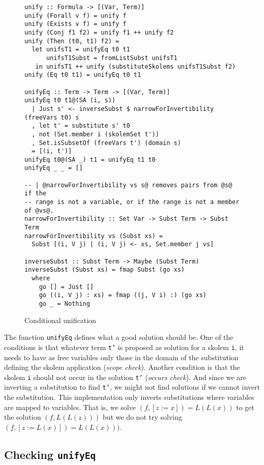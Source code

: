 \documentclass[sigconf, anonymous, review]{acmart}
\newcommand{\tc}[1]{{\small\texttt{#1}}}
\begin{document}
\begin{figure}
\begin{verbatim}
unify :: Formula -> [(Var, Term)]
unify (Forall v f) = unify f
unify (Exists v f) = unify f
unify (Conj f1 f2) = unify f1 ++ unify f2
unify (Then (t0, t1) f2) =
  let unifsT1 = unifyEq t0 t1
      unifsT1Subst = fromListSubst unifsT1
   in unifsT1 ++ unify (substituteSkolems unifsT1Subst f2)
unify (Eq t0 t1) = unifyEq t0 t1

unifyEq :: Term -> Term -> [(Var, Term)]
unifyEq t0 t1@(SA (i, s))
  | Just s' <- inverseSubst $ narrowForInvertibility (freeVars t0) s
  , let t' = substitute s' t0
  , not (Set.member i (skolemSet t'))
  , Set.isSubsetOf (freeVars t') (domain s)
  = [(i, t')]
unifyEq t0@(SA _) t1 = unifyEq t1 t0
unifyEq _ _ = []

-- | @narrowForInvertibility vs s@ removes pairs from @s@ if the
-- range is not a variable, or if the range is not a member of @vs@.
narrowForInvertibility :: Set Var -> Subst Term -> Subst Term
narrowForInvertibility vs (Subst xs) =
  Subst [(i, V j) | (i, V j) <- xs, Set.member j vs]

inverseSubst :: Subst Term -> Maybe (Subst Term)
inverseSubst (Subst xs) = fmap Subst (go xs)
  where
    go [] = Just []
    go ((i, V j) : xs) = fmap ((j, V i) :) (go xs)
    go _ = Nothing
\end{verbatim}
\caption{Conditional unification}
\label{conditional-unification}
\end{figure}

The function \tc{unifyEq} defines what a good solution should be.
One of the conditions is that whatever term \tc{t'} is proposed
as solution for a skolem \tc{i}, it needs to have as free variables only those in the
domain of the substitution defining the skolem application
(\textit{scope check}). Another
condition is that the skolem \tc{i} should not occur in the solution
\tc{t'} (\textit{occurs check}). And since we are inverting a substitution to find
\tc{t'}, we might not find solutions if we cannot invert the
substitution. This implementation only inverts substitutions where
variables are mapped to variables. That is, we solve $(f, [z:=x]) = L(L(x))$
to get the solution $(f, L(L(z)))$ but we do not try solving $(f, [z:=L(x)]) = L(L(x)))$.

\subsection{Checking \tc{unifyEq}}
\end{document}
